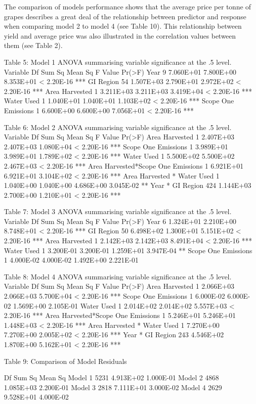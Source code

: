 \documentclass[
  journal=large,
  manuscript=article-type,
  year=2023,
  volume=?,
]{cup-journal}
\begin{document}
The comparison of models performance shows that the average price per tonne of grapes describes a great deal of the relationship between predictor and response when comparing model 2 to model 4 (see Table 10). This relationship between yield and average price was also illustrated in the correlation values between them (see Table 2). 


Table 5: Model 1 ANOVA summarising variable significance at the .5 level.
Variable
Df
Sum Sq
Mean Sq
F Value
Pr(>F)
Year
9
7.060E+01
7.800E+00
8.353E+01
< 2.20E-16 ***
GI Region
54
1.507E+03
2.790E+01
2.972E+02
< 2.20E-16 ***
Area Harvested
1
3.211E+03
3.211E+03
3.419E+04
< 2.20E-16 ***
Water Used
1
1.040E+01
1.040E+01
1.103E+02
< 2.20E-16 ***
Scope One Emissions
1
6.600E+00
6.600E+00
7.056E+01
< 2.20E-16 ***

Table 6: Model 2 ANOVA summarising variable significance at the .5 level.
Variable
Df
Sum Sq
Mean Sq
F Value
Pr(>F)
Area Harvested
1
2.407E+03
2.407E+03
1.080E+04
< 2.20E-16 ***
Scope One Emissions
1
3.989E+01
3.989E+01
1.789E+02
< 2.20E-16 ***
Water Used
1
5.500E+02
5.500E+02
2.467E+03
< 2.20E-16 ***
Area Harvested*Scope One Emissions
1
6.921E+01
6.921E+01
3.104E+02
< 2.20E-16 ***
Area Harvested * Water Used
1
1.040E+00
1.040E+00
4.686E+00
3.045E-02 **
Year * GI Region
424
1.144E+03
2.700E+00
1.210E+01
< 2.20E-16 ***

Table 7: Model 3 ANOVA summarising variable significance at the .5 level.
Variable
Df
Sum Sq
Mean Sq
F Value
Pr(>F)
Year
6
1.324E+01
2.210E+00
8.748E+01
< 2.20E-16 ***
GI Region
50
6.498E+02
1.300E+01
5.151E+02
< 2.20E-16 ***
Area Harvested
1
2.142E+03
2.142E+03
8.491E+04
< 2.20E-16 ***
Water Used
1
3.200E-01
3.200E-01
1.259E+01
3.947E-04 **
Scope One Emissions
1
4.000E-02
4.000E-02
1.492E+00
2.221E-01

Table 8: Model 4 ANOVA summarising variable significance at the .5 level.
Variable
Df
Sum Sq
Mean Sq
F Value
Pr(>F)
Area Harvested
1
2.066E+03
2.066E+03
5.700E+04
< 2.20E-16 ***
Scope One Emissions
1
6.000E-02
6.000E-02
1.569E+00
2.105E-01
Water Used
1
2.014E+02
2.014E+02
5.557E+03
< 2.20E-16 ***
Area Harvested*Scope One Emissions
1
5.246E+01
5.246E+01
1.448E+03
< 2.20E-16 ***
Area Harvested * Water Used
1
7.270E+00
7.270E+00
2.005E+02
< 2.20E-16 ***
Year * GI Region
243
4.546E+02
1.870E+00
5.162E+01
< 2.20E-16 ***


Table 9: Comparison of Model Residuals

Df
Sum Sq
Mean Sq
Model 1
5231
4.913E+02
1.000E-01
Model 2
4868
1.085E+03
2.200E-01
Model 3
2818
7.111E+01
3.000E-02
Model 4
2629
9.528E+01
4.000E-02
\end{document}
